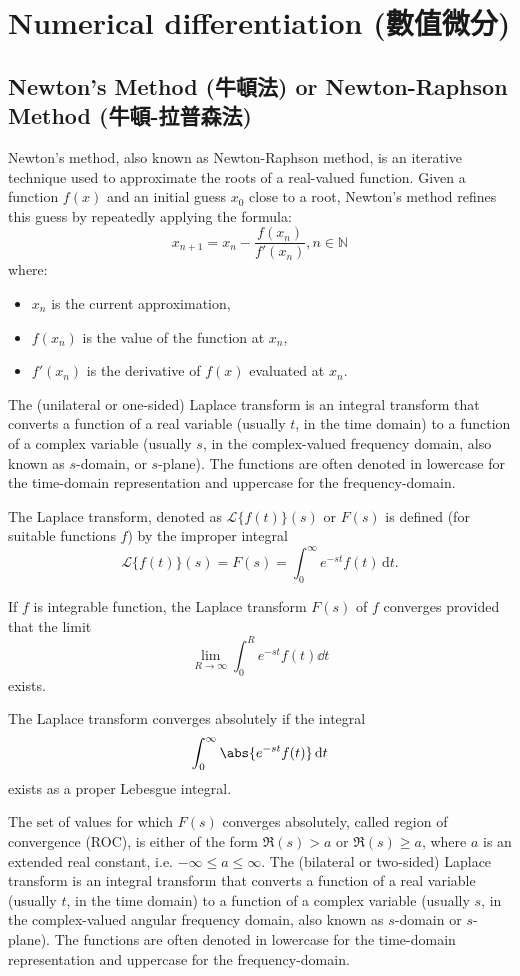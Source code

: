 \documentclass[a4paper,12pt]{report}
\begin{document}
\section{Numerical differentiation (數值微分)}
\subsection{Newton's Method (牛頓法) or Newton-Raphson Method (牛頓-拉普森法)}
Newton's method, also known as Newton-Raphson method, is an iterative technique used to approximate the roots of a real-valued function. Given a function \( f(x) \) and an initial guess \( x_0 \) close to a root, Newton's method refines this guess by repeatedly applying the formula:
\[
x_{n+1} = x_n - \frac{f(x_n)}{f'(x_n)},n\in\mathbb{N}
\]
where:
\begin{itemize}
\item \( x_n \) is the current approximation,
\item \( f(x_n) \) is the value of the function at \( x_n \),
\item \( f'(x_n) \) is the derivative of \( f(x) \) evaluated at \( x_n \).
\end{itemize}
The (unilateral or one-sided) Laplace transform is an integral transform that converts a function of a real variable (usually $t$, in the time domain) to a function of a complex variable (usually $s$, in the complex-valued frequency domain, also known as $s$-domain, or $s$-plane). The functions are often denoted in lowercase for the time-domain representation and uppercase for the frequency-domain.

The Laplace transform, denoted as $\mathcal{L}\{f(t)\}(s)$ or $F(s)$ is defined (for suitable functions $f$) by the improper integral
\[\mathcal{L}\{f(t)\}(s) = F(s) = \int_0^{\infty} e^{-st} f(t)\,\mathrm{d}t.\]

If $f$ is integrable function, the Laplace transform $F(s)$ of $f$ converges provided that the limit 
\[\lim _{R\to \infty }\int _{0}^{R}e^{-st}f(t)\dd{t}\]
exists.

The Laplace transform converges absolutely if the integral
\[\int_0^{\infty} \abs{e^{-st} f(t)}\,\mathrm{d}t\]
exists as a proper Lebesgue integral.

The set of values for which $F(s)$ converges absolutely, called region of convergence (ROC), is either of the form $\Re(s) > a$ or $\Re(s) \geq a$, where $a$ is an extended real constant, i.e. $-\infty\leq a\leq\infty$.
The (bilateral or two-sided) Laplace transform is an integral transform that converts a function of a real variable (usually $t$, in the time domain) to a function of a complex variable (usually $s$, in the complex-valued angular frequency domain, also known as $s$-domain or $s$-plane). The functions are often denoted in lowercase for the time-domain representation and uppercase for the frequency-domain.
\end{document}
